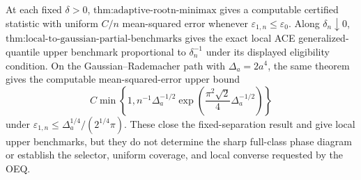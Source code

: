 At each fixed \(\delta>0\), \(\text{thm:adaptive-rootn-minimax}\) gives a computable certified statistic with uniform \(C/n\) mean-squared error whenever \(\varepsilon_{1,n}\le\varepsilon_0\).  Along \(\delta_n\downarrow0\), \(\text{thm:local-to-gaussian-partial-benchmarks}\) gives the exact local ACE generalized-quantile upper benchmark proportional to \(\delta_n^{-1}\) under its displayed eligibility condition.  On the Gaussian--Rademacher path with \(\Delta_a=2a^4\), the same theorem gives the computable mean-squared-error upper bound
\[
 C\min\!\left\{1,n^{-1}\Delta_a^{-1/2}
 \exp\!\left(\frac{\pi^2\sqrt2}{4}\Delta_a^{-1/2}\right)\right\}
\]
under \(\varepsilon_{1,n}\le\Delta_a^{1/4}/(2^{1/4}\pi)\).  These close the fixed-separation result and give local upper benchmarks, but they do not determine the sharp full-class phase diagram or establish the selector, uniform coverage, and local converse requested by the OEQ.